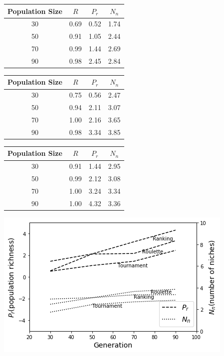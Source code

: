 \documentclass[smallextended]{svjour3}       %
\begin{document}
\begin{multicols}{2}
\begin{center}
\begin{tabular}{cccc}
	\toprule
    Population Size& $R$   &  $P_{r}$ & $N_{n}$\\
	\midrule
    30& 0.69  &  0.52   & 1.74 \\
    50& 0.91  &  1.05   & 2.44 \\
    70& 0.99  &  1.44   & 2.69 \\
    90& 0.98  &  2.45   & 2.84 \\
	\bottomrule
\end{tabular}
\label{tab:case2-generation-30}
\end{center}

\begin{center}
\begin{tabular}{cccc}
	\toprule
    Population Size& $R$   &  $P_{r}$ & $N_{n}$\\
	\midrule
    30& 0.75  &  0.56   & 2.47 \\
    50& 0.94  &  2.11   & 3.07 \\
    70& 1.00  &  2.16   & 3.65 \\
    90& 0.98  &  3.34   & 3.85 \\
	\bottomrule
\end{tabular}
\label{tab:case2-generation-50}
\end{center}

\begin{center}
\begin{tabular}{cccc}
	\toprule
    Population Size& $R$   &  $P_{r}$ & $N_{n}$\\
	\midrule
    30& 0.91  &  1.44   & 2.95 \\
    50& 0.99  &  2.12   & 3.08 \\
    70& 1.00  &  3.24   & 3.34 \\
    90& 1.00  &  4.32   & 3.36 \\
	\bottomrule
\end{tabular}
\label{tab:case2-generation-70}
\end{center}

\begin{center}
  \includegraphics[width=\linewidth]{GA_images/example-case2.png}
  \label{fig:case2result}
\end{center}


\end{multicols}
\end{document}
